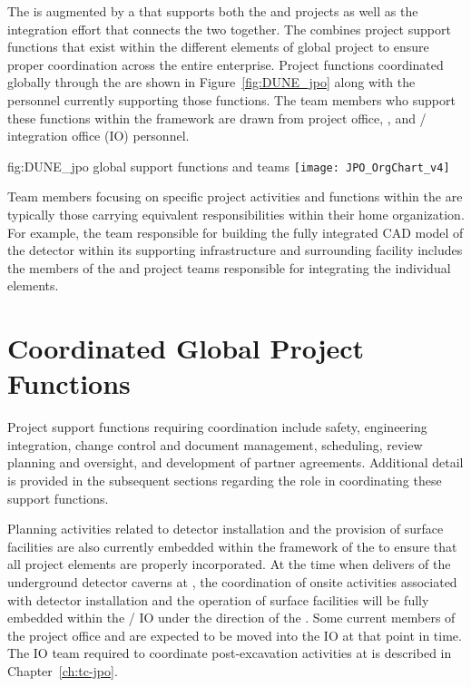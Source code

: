 The  is augmented by a  that supports both 
the  and  projects as well as the integration
effort that connects the two together. The  combines
project support functions that exist within the different elements 
of global project to ensure proper coordination across the entire 
 enterprise.  Project functions coordinated globally 
through the  are shown in Figure~\ref{fig:DUNE_jpo} along 
with the personnel currently supporting those functions.  The team 
members who support these functions within the  framework
are drawn from  project office,  , 
and / integration office (IO) personnel.  
\begin{dunefigure}{fig:DUNE_jpo}
  { global support functions and teams}
  \texttt{[image: JPO\_OrgChart\_v4]}
\end{dunefigure}
Team members focusing on specific project activities and functions 
within the  are typically those carrying equivalent 
responsibilities within their home organization.  For example, 
the  team responsible for building the fully integrated 
\threed CAD model of the detector within its supporting infrastructure 
and surrounding facility includes the members of the  and 
 project teams responsible for integrating the individual 
elements.

\section{Coordinated Global Project Functions}
\label{sec:global_project}

Project support functions requiring  coordination include
safety, engineering integration, change control and document 
management, scheduling, review planning and oversight, and development 
of partner agreements.  Additional detail is provided in the subsequent 
sections regarding the  role in coordinating these support 
functions.

Planning activities related to detector installation and the provision 
of surface facilities are also currently embedded within the framework 
of the  to ensure that all project elements are properly 
incorporated.  At the time when   delivers 
 of the underground detector caverns at , the 
coordination of onsite activities associated with detector installation 
and the operation of surface facilities will be fully embedded within 
the / IO under the direction of the .  
Some current members of the  project office and 
 are expected to be moved into the IO at that point in time.  
The IO team required to coordinate post-excavation activities at 
 is described in Chapter~\ref{ch:tc-jpo}.  

